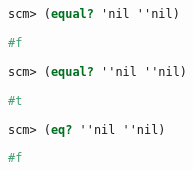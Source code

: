 \begin{lstlisting}[language=Scheme]
scm> (equal? 'nil ''nil)
\end{lstlisting}
\begin{solution}[0.25in]
\begin{lstlisting}[language=Scheme]
#f
\end{lstlisting}
\end{solution}

\begin{lstlisting}[language=Scheme]
scm> (equal? ''nil ''nil)
\end{lstlisting}
\begin{solution}[0.25in]
\begin{lstlisting}[language=Scheme]
#t
\end{lstlisting}
\end{solution}

\begin{lstlisting}[language=Scheme]
scm> (eq? ''nil ''nil)
\end{lstlisting}
\begin{solution}[0.25in]
\begin{lstlisting}[language=Scheme]
#f
\end{lstlisting}
\end{solution}
